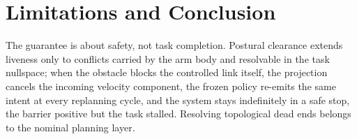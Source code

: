 \documentclass[journal]{IEEEtran}
\begin{document}
%

\section{Limitations and Conclusion}
The guarantee is about safety, not task completion. Postural clearance extends liveness only to conflicts carried by the arm body and resolvable in the task nullspace; when the obstacle blocks the controlled link itself, the projection cancels the incoming velocity component, the frozen policy re-emits the same intent at every replanning cycle, and the system stays indefinitely in a safe stop, the barrier positive but the task stalled. Resolving topological dead ends belongs to the nominal planning layer.
\end{document}
